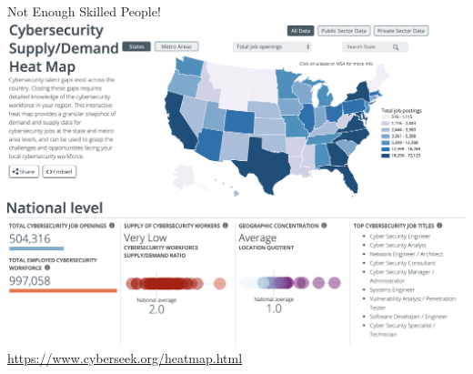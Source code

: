 \documentclass[nobackground,dvipsnames,table,aspectratio=169]{beamer}
\begin{document}
\begin{frame}{}
    \thispagestyle{empty}
\end{frame}

\begin{frame}{Not Enough Skilled People!}
    \centering
    \includegraphics[height=0.7\textheight]{cybersec-in-demand}
    \scriptsize
    \underline{\url{https://www.cyberseek.org/heatmap.html}}
\end{frame}
\end{document}
